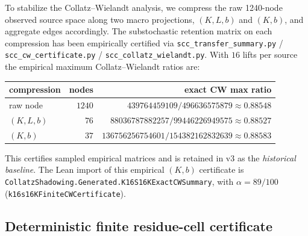 \documentclass[11pt,a4paper]{article}
\theoremstyle{definition}
\begin{document}
To stabilize the Collatz--Wielandt analysis, we compress the raw
1240-node observed source space along two macro projections,
$(K, L, b)$ and $(K, b)$, and aggregate edges accordingly. The
substochastic retention matrix on each compression has been
empirically certified via
\verb|scc_transfer_summary.py| /
\verb|scc_cw_certificate.py| /
\verb|scc_collatz_wielandt.py|. With $16$ lifts per source the
empirical maximum Collatz--Wielandt ratios are:
\begin{center}
\begin{tabular}{lrr}
\toprule
compression & nodes & exact CW max ratio \\
\midrule
raw node      & $1240$ & $439764459109/496636575879   \approx 0.88548$ \\
$(K,L,b)$     & $76$   & $88036787882257/99446226949575 \approx 0.88527$ \\
$(K,b)$       & $37$   & $136756256754601/154382162832639 \approx 0.88583$ \\
\bottomrule
\end{tabular}
\end{center}
This certifies sampled empirical matrices and is retained in v3 as
the \emph{historical baseline}. The Lean import of this empirical
$(K, b)$ certificate is
\texttt{CollatzShadowing.Generated.K16S16KExactCWSummary}, with
$\alpha = 89/100$
(\texttt{k16s16KFiniteCWCertificate}).

\subsection{Deterministic finite residue-cell certificate}
\label{sec:deterministic}
\end{document}
